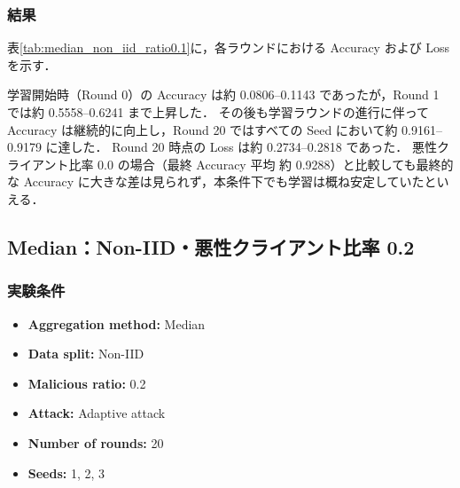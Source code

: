 \documentclass[a4j,twocolumn,dvipdfmx]{jsarticle}
\begin{document}
\subsubsection{結果}

表\ref{tab:median_non_iid_ratio0.1}に，各ラウンドにおける
Accuracy および Loss を示す．

学習開始時（Round 0）の Accuracy は約 0.0806--0.1143 であったが，Round 1 では約 0.5558--0.6241 まで上昇した． その後も学習ラウンドの進行に伴って Accuracy は継続的に向上し，Round 20 ではすべての Seed において約 0.9161--0.9179 に達した． Round 20 時点の Loss は約 0.2734--0.2818 であった． 悪性クライアント比率 0.0 の場合（最終 Accuracy 平均 約 0.9288）と比較しても最終的な Accuracy に大きな差は見られず，本条件下でも学習は概ね安定していたといえる．

\clearpage
\subsection{Median：Non-IID・悪性クライアント比率 0.2}

\subsubsection{実験条件}

\begin{itemize}
    \item \textbf{Aggregation method:} Median
    \item \textbf{Data split:} Non-IID
    \item \textbf{Malicious ratio:} 0.2
    \item \textbf{Attack:} Adaptive attack
    \item \textbf{Number of rounds:} 20
    \item \textbf{Seeds:} 1, 2, 3
\end{itemize}

\end{document}
